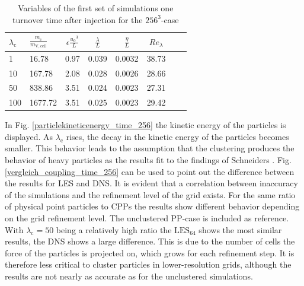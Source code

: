 \documentclass[11pt,a4paper,openany,oneside,parskip=half*]{article}
\begin{document}
\begin{table}[h]
	\begin{center}
	\begin{tabular}{l l | c c c c c c }
	$\lambda_\mathrm{c}$& $\frac{m_\mathrm{c}}{m_\mathrm{V,cell}}$ & $\epsilon \frac{{u_0}^3}{L}$ & $\frac{\lambda}{L}$ & $\frac{\eta}{L} $ & $Re_\lambda$ \\
	\hline
	\hline
	1 &16.78 & 0.97& 0.039 & 0.0032 & 38.73 &\\
	10 &167.78 & 2.08 & 0.028 & 0.0026 & 28.66 &\\
	50 &838.86 & 3.51 & 0.024 & 0.0023 & 27.31 &\\
	100 &1677.72 & 3.51 & 0.025 & 0.0023 & 29.42 &\\
	\hline
	\end{tabular}
	\captionsetup{width=0.9\linewidth}
	\caption{Variables of the first set of simulations one turnover time after injection for the $256^3$-case}
	\label{table_values}
	\end{center}
	\end{table}
In Fig. \ref{particlekineticenergy_time_256} the kinetic energy of the particles is displayed. As $\lambda_\mathrm{c}$ rises, the decay in the kinetic energy of the particles becomes smaller. This behavior leads to the assumption that the clustering produces the behavior of heavy particles as the results fit to the findings of Schneiders \cite{Schneiders2017}. Fig. \ref{vergleich_coupling_time_256} can be used to point out the difference between the results for LES and DNS. It is evident that a correlation between inaccuracy of the simulations and the refinement level of the grid exists. For the same ratio of physical point particles to CPPs the results show different behavior depending on the grid refinement level. The unclustered PP-case is included as reference. With $\lambda_\mathrm{c}=50$ being a relatively high ratio the $\mathrm{LES}_\mathrm{64}$ shows the most similar results, the DNS shows a large difference. This is due to the number of cells the force of the particles is projected on, which grows for each refinement step. It is therefore less critical to cluster particles in lower-resolution grids, although the results are not nearly as accurate as for the unclustered simulations. 
\end{document}
